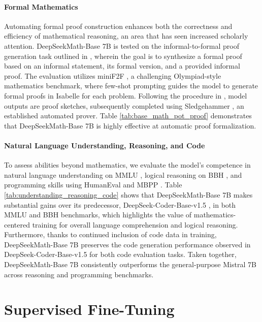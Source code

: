 \paragraph{Formal Mathematics}

Automating formal proof construction enhances both the correctness and efficiency of mathematical reasoning, an area that has seen increased scholarly attention. DeepSeekMath-Base 7B is tested on the informal-to-formal proof generation task outlined in \citep{dsp_proof}, wherein the goal is to synthesize a formal proof based on an informal statement, its formal version, and a provided informal proof. The evaluation utilizes miniF2F \citep{minif2f}, a challenging Olympiad-style mathematics benchmark, where few-shot prompting guides the model to generate formal proofs in Isabelle for each problem. Following the procedure in \cite{dsp_proof}, model outputs are proof sketches, subsequently completed using Sledgehammer \citep{sledgehammer}, an established automated prover. Table \ref{tab:base_math_pot_proof} demonstrates that DeepSeekMath-Base 7B is highly effective at automatic proof formalization.

\paragraph{Natural Language Understanding, Reasoning, and Code}

To assess abilities beyond mathematics, we evaluate the model’s competence in natural language understanding on MMLU \citep{mmlu}, logical reasoning on BBH \citep{bbh}, and programming skills using HumanEval \citep{codex} and MBPP \citep{mbpp}. Table \ref{tab:understanding_reasoning_code} shows that DeepSeekMath-Base 7B makes substantial gains over its predecessor, DeepSeek-Coder-Base-v1.5 \citep{deepseek-coder}, in both MMLU and BBH benchmarks, which highlights the value of mathematics-centered training for overall language comprehension and logical reasoning. Furthermore, thanks to continued inclusion of code data in training, DeepSeekMath-Base 7B preserves the code generation performance observed in DeepSeek-Coder-Base-v1.5 for both code evaluation tasks. Taken together, DeepSeekMath-Base 7B consistently outperforms the general-purpose Mistral 7B \citep{mistral} across reasoning and programming benchmarks.

\section{Supervised Fine-Tuning}

